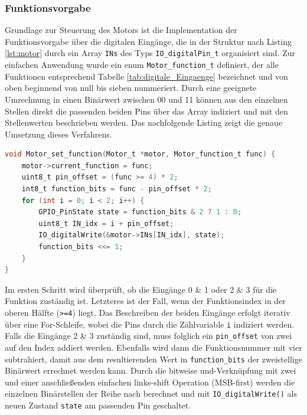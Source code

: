 \subsubsection{Funktionsvorgabe}
Grundlage zur Steuerung des Motors ist die Implementation der Funktionsvorgabe über die digitalen Eingänge, die in der Struktur nach Listing \ref{lst:motor} durch ein Array \verb|INs| des Typs \verb|IO_digitalPin_t| organisiert sind. Zur einfachen Anwendung wurde ein enum \verb|Motor_function_t| definiert, der alle Funktionen entsprechend Tabelle \ref{tab:digitale_Eingaenge} bezeichnet und von oben beginnend von null bis sieben nummeriert. Durch eine geeignete Umrechnung in einen Binärwert zwischen 00 und 11 können aus den einzelnen Stellen direkt die passenden beiden Pins über das Array indiziert und mit den Stellenwerten beschrieben werden. Das nachfolgende Listing zeigt die genaue Umsetzung dieses Verfahrens.
\begin{lstlisting}[language=C, caption={Einstellung der Motorfunktionen}, label={lst:motorFunction}]
void Motor_set_function(Motor_t *motor, Motor_function_t func) {
	motor->current_function = func;
	uint8_t pin_offset = (func >= 4) * 2;
	int8_t function_bits = func - pin_offset * 2;
	for (int i = 0; i < 2; i++) {
		GPIO_PinState state = function_bits & 2 ? 1 : 0;
		uint8_t IN_idx = i + pin_offset;
		IO_digitalWrite(&motor->INs[IN_idx], state);
		function_bits <<= 1;
	}
}
\end{lstlisting}
Im ersten Schritt wird überprüft, ob die Eingänge 0 \& 1 oder 2 \& 3 für die Funktion zuständig ist. Letzteres ist der Fall, wenn der Funktionsindex in der oberen Hälfte (\verb|>=4|) liegt. Das Beschreiben der beiden Eingänge erfolgt iterativ über eine For-Schleife, wobei die Pins durch die Zählvariable \verb|i| indiziert werden. Falls die Eingänge 2 \& 3 zuständig sind, muss folglich ein \verb|pin_offset| von zwei auf den Index addiert werden. Ebenfalls wird dann die Funktionsnummer mit vier subtrahiert, damit aus dem resultierenden Wert in \verb|function_bits| der zweistellige Binärwert errechnet werden kann.
Durch die bitweise und-Verknüpfung mit zwei und einer anschließenden einfachen links-shift Operation (\acs{MSB}-first) werden die einzelnen Binärstellen der Reihe nach berechnet und mit \verb|IO_digitalWrite()| als neuen Zustand \verb|state| am passenden Pin geschaltet.
